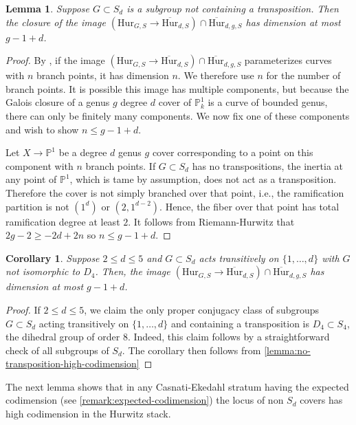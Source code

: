 \documentclass[12 pt]{amsart}
\theoremstyle{plain}
\newtheorem{lemma}[theorem]{Lemma}
\newtheorem{corollary}[theorem]{Corollary}
\theoremstyle{definition}
\theoremstyle{remark}
\numberwithin{equation}{section}
\newcommand\bp{\mathbb P}
\newcommand\bighur[2]{\overline{\mathrm{Hur}}_{#1,#2}} %
\newcommand\bighurg[3]{\overline{\mathrm{Hur}}_{#1,#2, #3}} %
\newcommand\grouphur[2]{\mathrm{Hur}_{#1,#2}} %
\begin{document}
\begin{lemma} \label{lemma:no-transposition-high-codimension} Suppose $G \subset
	S_d$ is a subgroup not containing a transposition. Then the closure of
	the image $(\grouphur G S \to \bighur d S) \cap \bighurg d g S$ has
	dimension at most $g - 1 + d$.  \end{lemma} 
	\begin{proof} By \cite[Thm.\
		4]{wewers:thesis}, if the image $(\grouphur G S \to \bighur d S)
		\cap \bighurg d g S$ parameterizes curves with $n$ branch
		points, it has dimension $n$.  
		We therefore use $n$ for the number of branch points.
		It is possible this image has multiple components, but because
		the Galois closure of a genus $g$ degree $d$ cover of
		$\bp^1_k$ is a curve of bounded genus, there can only be finitely many
		components. We now fix one of these components and wish to show
		$n \leq g - 1 + d$.

		Let $X \to \bp^1$ be a degree $d$ genus $g$ cover corresponding to a point
		on this component with $n$ branch points.
		If $G \subset S_d$ has no
		transpositions, the inertia at any point of $\bp^1$, which is
		tame by assumption, does not act as a transposition.
		Therefore the cover is not simply branched over that point, 
		i.e., the ramification partition is not
		$(1^d)$ or $(2,1^{d-2})$. 
		Hence, the fiber over that point has total ramification
		degree at least $2$.  It follows from Riemann-Hurwitz that 
		$2g - 2 \geq -2d + 2n$ so $n \leq g - 1 + d$.  \end{proof}
		\begin{corollary}
			\label{corollary:high-codimension-for-low-degree}
			Suppose $2
			\leq d \leq 5$ and $G \subset S_d$ acts transitively
			on $\{1, \ldots, d\}$ with $G$ not isomorphic to $D_4$.
			Then, the image $(\grouphur G S \to \bighur d S) \cap \bighurg
			d g S$ has dimension at most $g - 1 + d$.
		\end{corollary} \begin{proof} 
			If $2 \leq d \leq 5$, we claim the only proper conjugacy class of
			subgroups $G \subset S_d$ acting transitively
			on $\{1, \ldots, d\}$ and containing a transposition is
			$D_4 \subset S_4$, the dihedral group of order $8$. 
			Indeed, this claim follows by a
		straightforward check of all subgroups of $S_d$.	
		The corollary then follows from \autoref{lemma:no-transposition-high-codimension}
\end{proof}

The next lemma shows that in any Casnati-Ekedahl stratum having the 
expected codimension (see \autoref{remark:expected-codimension})
the locus of non $S_d$ covers has high codimension in the Hurwitz stack.
\end{document}
